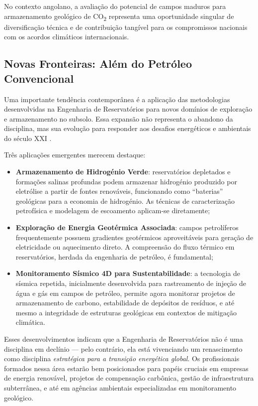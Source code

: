 \documentclass[
  12pt,
  a4paper,
  oneside,
  brazilian,
  sumario=tradicional
]{abntex2}
\begin{document}
No contexto angolano, a avaliação do potencial de campos maduros para
armazenamento geológico de CO\textsubscript{2} representa uma
oportunidade singular de diversificação técnica e de contribuição
tangível para os compromissos nacionais com os acordos climáticos
internacionais.

\subsection{Novas Fronteiras: Além do Petróleo Convencional}

Uma importante tendência contemporânea é a aplicação das metodologias
desenvolvidas na Engenharia de Reservatórios para novos domínios de
exploração e armazenamento no subsolo. Essa expansão não representa
o abandono da disciplina, mas sua evolução para responder aos desafios
energéticos e ambientais do século XXI \cite{terry2015}.

Três aplicações emergentes merecem destaque:

\begin{itemize}
  \item \textbf{Armazenamento de Hidrogénio Verde}: reservatórios depletados
    e formações salinas profundas podem armazenar hidrogénio produzido
    por eletrólise a partir de fontes renováveis, funcionando como
    ``baterias'' geológicas para a economia de hidrogénio. As técnicas
    de caracterização petrofísica e modelagem de escoamento aplicam-se
    diretamente;
  \item \textbf{Exploração de Energia Geotérmica Associada}: campos
    petrolíferos frequentemente possuem gradientes geotérmicos aproveitáveis
    para geração de eletricidade ou aquecimento direto. A compreensão
    do fluxo térmico em reservatórios, herdada da engenharia de petróleo,
    é fundamental;
  \item \textbf{Monitoramento Sísmico 4D para Sustentabilidade}: a tecnologia
    de sísmica repetida, inicialmente desenvolvida para rastreamento de
    injeção de água e gás em campos de petróleo, permite agora monitorar
    projetos de armazenamento de carbono, estabilidade de depósitos de
    resíduos, e até mesmo a integridade de estruturas geológicas em
    contextos de mitigação climática.
\end{itemize}

Esses desenvolvimentos indicam que a Engenharia de Reservatórios não é
uma disciplina em declínio — pelo contrário, ela está vivenciando um
renascimento como disciplina \textit{estratégica para a transição
energética global}. Os profissionais formados nessa área estarão bem
posicionados para papéis cruciais em empresas de energia renovável,
projetos de compensação carbônica, gestão de infraestrutura subterrânea,
e até em agências ambientais especializadas em monitoramento geológico.
\end{document}

